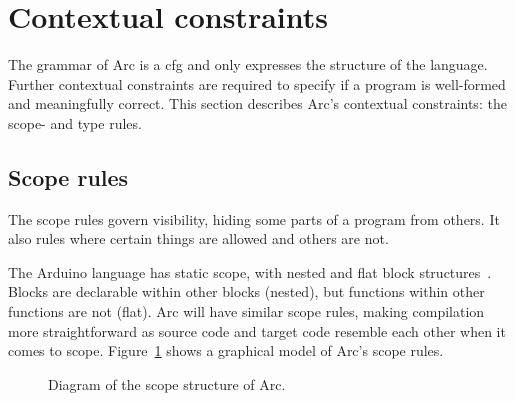 \section{Contextual constraints}\label{sec:contextualconstraints}
The grammar of Arc is a \gls{cfg} and only expresses the structure of the language. Further contextual constraints are required to specify if a program is well-formed and meaningfully correct. This section describes Arc's contextual constraints: the scope- and type rules.

\subsection{Scope rules}\label{subsec:scoperules}
The scope rules govern visibility, hiding some parts of a program from others. It also rules where certain things are allowed and others are not.

The Arduino language has static scope, with nested and flat block structures~\cite{cppref}. Blocks are declarable within other blocks (nested), but functions within other functions are not (flat). Arc will have similar scope rules, making compilation more straightforward as source code and target code resemble each other when it comes to scope. Figure~\ref{fig:arcscoperules} shows a graphical model of Arc's scope rules.


\begin{figure}[htbp]
    \centering
    \caption{Diagram of the scope structure of Arc.}
    \label{fig:arcscoperules}
\end{figure}


